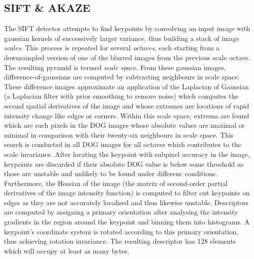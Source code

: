 \subsection{SIFT \& AKAZE}

The SIFT detector attempts to find keypoints by convolving an input image with
gaussian kernels of successively larger variance, thus building a stack of image
\emph{scales}. This process is repeated for several \emph{octaves}, each starting
from a downsampled version of one of the blurred images from the previous scale
octave. The resulting pyramid is termed \emph{scale space}.  From these gaussian
images, difference-of-gaussians are computed by subtracting neighbours in scale
space. These difference images approximate an application of the Laplacian of
Gaussian (a Laplacian filter with prior smoothing to remove noise) which computes
the second spatial derivatives of the image and whose extremes are locations of
rapid intensity change like edges or corners. Within this scale space, extrema
are found which are such pixels in the DOG images whose absolute values are
maximal or minimal in comparison with their twenty-six neighbours in scale
space. This search is conducted in all DOG images for all octaves which
contributes to the scale invariance. After locating the keypoint with subpixel
accuracy in the image, keypoints are discarded if their absolute DOG value is
below some threshold as those are unstable and unlikely to be found under
differenc conditions. Furthermore, the Hessian of the
image (the matrix of second-order partial derivatives of the image intensity
function) is computed to filter out keypoints on edges as they are not accurately
localised and thus likewise unstable. Descriptors are computed by assigning a
primary orientation after analysing the intensity gradients in the region around the
keypoint and binning them into histograms. A keypoint's coordinate system is
rotated according to this primary orientation, thus achieving rotation
invariance. The resulting descriptor has 128 elements which will occupy at least
as many bytes.

